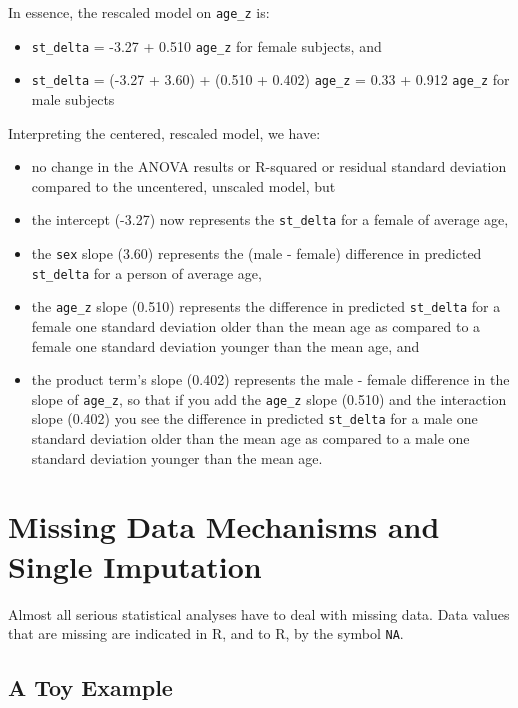 \documentclass[]{book}
\providecommand{\tightlist}{%
  \setlength{\itemsep}{0pt}\setlength{\parskip}{0pt}}
\theoremstyle{definition}
\theoremstyle{definition}
\theoremstyle{definition}
\theoremstyle{remark}
\begin{document}
In essence, the rescaled model on \texttt{age\_z} is:

\begin{itemize}
\tightlist
\item
  \texttt{st\_delta} = -3.27 + 0.510 \texttt{age\_z} for female
  subjects, and
\item
  \texttt{st\_delta} = (-3.27 + 3.60) + (0.510 + 0.402) \texttt{age\_z}
  = 0.33 + 0.912 \texttt{age\_z} for male subjects
\end{itemize}

Interpreting the centered, rescaled model, we have:

\begin{itemize}
\tightlist
\item
  no change in the ANOVA results or R-squared or residual standard
  deviation compared to the uncentered, unscaled model, but
\item
  the intercept (-3.27) now represents the \texttt{st\_delta} for a
  female of average age,
\item
  the \texttt{sex} slope (3.60) represents the (male - female)
  difference in predicted \texttt{st\_delta} for a person of average
  age,
\item
  the \texttt{age\_z} slope (0.510) represents the difference in
  predicted \texttt{st\_delta} for a female one standard deviation older
  than the mean age as compared to a female one standard deviation
  younger than the mean age, and
\item
  the product term's slope (0.402) represents the male - female
  difference in the slope of \texttt{age\_z}, so that if you add the
  \texttt{age\_z} slope (0.510) and the interaction slope (0.402) you
  see the difference in predicted \texttt{st\_delta} for a male one
  standard deviation older than the mean age as compared to a male one
  standard deviation younger than the mean age.
\end{itemize}

\chapter{Missing Data Mechanisms and Single
Imputation}\label{missing-data-mechanisms-and-single-imputation}

Almost all serious statistical analyses have to deal with missing data.
Data values that are missing are indicated in R, and to R, by the symbol
\texttt{NA}.

\section{A Toy Example}\label{a-toy-example}
\end{document}
